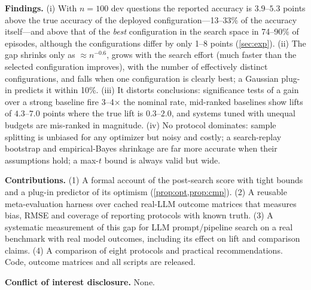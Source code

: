 \textbf{Findings.} (i) With $n{=}100$ dev questions the reported accuracy is $3.9$--$5.3$ points above the true accuracy of the deployed configuration---13--33\% of the accuracy itself---and above that of the \emph{best} configuration in the search space in 74--90\% of episodes, although the configurations differ by only 1--8 points (\cref{sec:exp}). (ii) The gap shrinks only as $\approx n^{-0.6}$, grows with the search effort (much faster than the selected configuration improves), with the number of effectively distinct configurations, and falls when one configuration is clearly best; a Gaussian plug-in predicts it within 10\%. (iii) It distorts conclusions: significance tests of a gain over a strong baseline fire 3--4$\times$ the nominal rate, mid-ranked baselines show lifts of $4.3$--$7.0$ points where the true lift is $0.3$--$2.0$, and systems tuned with unequal budgets are mis-ranked in magnitude. (iv) No protocol dominates: sample splitting is unbiased for any optimizer but noisy and costly; a search-replay bootstrap and empirical-Bayes shrinkage are far more accurate when their assumptions hold; a max-$t$ bound is always valid but wide.

\textbf{Contributions.} (1) A formal account of the post-search score with tight bounds and a plug-in predictor of its optimism (\cref{prop:opt,prop:cmp}). (2) A reusable meta-evaluation harness over cached real-LLM outcome matrices that measures bias, RMSE and coverage of reporting protocols with known truth. (3) A systematic measurement of this gap for LLM prompt/pipeline search on a real benchmark with real model outcomes, including its effect on lift and comparison claims. (4) A comparison of eight protocols and practical recommendations. Code, outcome matrices and all scripts are released.

\textbf{Conflict of interest disclosure.} None.
